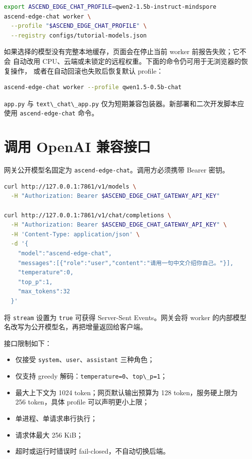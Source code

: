 \begin{lstlisting}[language=bash]
export ASCEND_EDGE_CHAT_PROFILE=qwen2-1.5b-instruct-mindspore
ascend-edge-chat worker \
  --profile "$ASCEND_EDGE_CHAT_PROFILE" \
  --registry configs/tutorial-models.json
\end{lstlisting}

如果选择的模型没有完整本地缓存，页面会在停止当前 worker
前报告失败；它不会 自动改用
CPU、云端或未锁定的远程权重。下面的命令仍可用于无浏览器的恢复操作，
或者在自动回滚也失败后恢复默认 profile：

\begin{lstlisting}[language=bash]
ascend-edge-chat worker --profile qwen1.5-0.5b-chat
\end{lstlisting}

\passthrough{\lstinline!app.py!} 与
\passthrough{\lstinline!text\_chat\_app.py!}
仅为短期兼容包装器。新部署和二次开发脚本应使用
\passthrough{\lstinline!ascend-edge-chat!} 命令。

\section{调用 OpenAI
兼容接口}\label{ux8c03ux7528-openai-ux517cux5bb9ux63a5ux53e3}

网关公开模型名固定为
\passthrough{\lstinline!ascend-edge-chat!}。调用方必须携带 Bearer 密钥。

\begin{lstlisting}[language=bash]
curl http://127.0.0.1:7861/v1/models \
  -H "Authorization: Bearer $ASCEND_EDGE_CHAT_GATEWAY_API_KEY"

curl http://127.0.0.1:7861/v1/chat/completions \
  -H "Authorization: Bearer $ASCEND_EDGE_CHAT_GATEWAY_API_KEY" \
  -H 'Content-Type: application/json' \
  -d '{
    "model":"ascend-edge-chat",
    "messages":[{"role":"user","content":"请用一句中文介绍你自己。"}],
    "temperature":0,
    "top_p":1,
    "max_tokens":32
  }'
\end{lstlisting}

将 \passthrough{\lstinline!stream!} 设置为
\passthrough{\lstinline!true!} 可获得 Server-Sent Events。网关会将
worker 的内部模型名改写为公开模型名，再把增量返回给客户端。

接口限制如下：

\begin{itemize}
\tightlist
\item
  仅接受
  \passthrough{\lstinline!system!}、\passthrough{\lstinline!user!}、\passthrough{\lstinline!assistant!}
  三种角色；
\item
  仅支持 greedy
  解码：\passthrough{\lstinline!temperature=0!}、\passthrough{\lstinline!top\_p=1!}；
\item
  最大上下文为 1024 token；网页默认输出预算为 128 token，服务硬上限为
  256 token，具体 profile 可以声明更小上限；
\item
  单进程、单请求串行执行；
\item
  请求体最大 256 KiB；
\item
  超时或运行时错误时 fail-closed，不自动切换后端。
\end{itemize}

